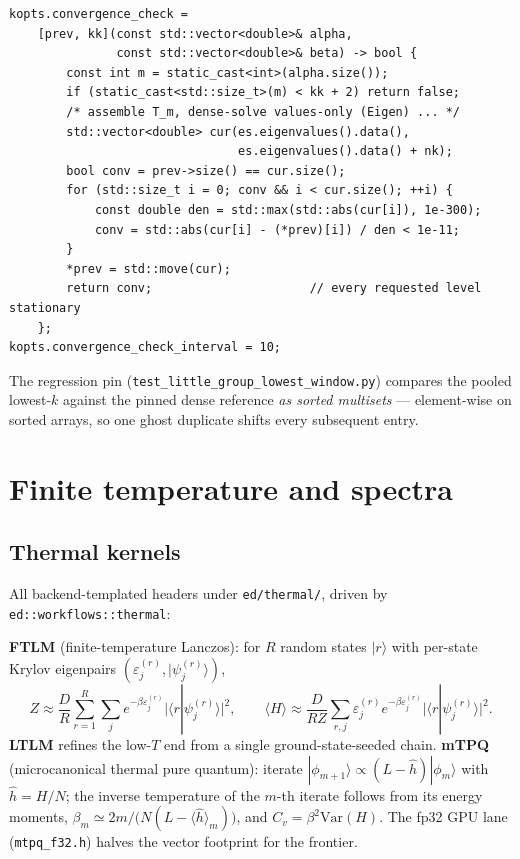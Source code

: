 \documentclass[11pt]{article}
\newcommand{\ket}[1]{|#1\rangle}
\newcommand{\braket}[2]{\langle#1|#2\rangle}
\newcommand{\file}[1]{\texttt{\small #1}}
\begin{document}
\begin{lstlisting}
kopts.convergence_check =
    [prev, kk](const std::vector<double>& alpha,
               const std::vector<double>& beta) -> bool {
        const int m = static_cast<int>(alpha.size());
        if (static_cast<std::size_t>(m) < kk + 2) return false;
        /* assemble T_m, dense-solve values-only (Eigen) ... */
        std::vector<double> cur(es.eigenvalues().data(),
                                es.eigenvalues().data() + nk);
        bool conv = prev->size() == cur.size();
        for (std::size_t i = 0; conv && i < cur.size(); ++i) {
            const double den = std::max(std::abs(cur[i]), 1e-300);
            conv = std::abs(cur[i] - (*prev)[i]) / den < 1e-11;
        }
        *prev = std::move(cur);
        return conv;                      // every requested level stationary
    };
kopts.convergence_check_interval = 10;
\end{lstlisting}

The regression pin (\file{test\_little\_group\_lowest\_window.py}) compares
the pooled lowest-$k$ against the pinned dense reference \emph{as sorted
multisets} --- element-wise on sorted arrays, so one ghost duplicate shifts
every subsequent entry.

\section{Finite temperature and spectra}

\subsection{Thermal kernels}

All backend-templated headers under \file{ed/thermal/}, driven by
\texttt{ed::workflows::thermal}:

\textbf{FTLM} (finite-temperature Lanczos): for $R$ random states $\ket{r}$
with per-state Krylov eigenpairs $(\varepsilon_j^{(r)}, \ket{\psi_j^{(r)}})$,
\begin{equation}
  Z \approx \frac{D}{R} \sum_{r=1}^{R} \sum_j
    e^{-\beta \varepsilon_j^{(r)}} \bigl|\braket{r}{\psi_j^{(r)}}\bigr|^2,
  \qquad
  \langle H \rangle \approx \frac{D}{RZ} \sum_{r,j}
    \varepsilon_j^{(r)} e^{-\beta \varepsilon_j^{(r)}}
    \bigl|\braket{r}{\psi_j^{(r)}}\bigr|^2 .
\end{equation}
\textbf{LTLM} refines the low-$T$ end from a single ground-state-seeded
chain. \textbf{mTPQ} (microcanonical thermal pure quantum): iterate
$\ket{\phi_{m+1}} \propto (L - \hat h)\ket{\phi_m}$ with
$\hat h = H/N$; the inverse temperature of the $m$-th iterate follows from
its energy moments,
$\beta_m \simeq 2m / \bigl(N (L - \langle \hat h \rangle_m)\bigr)$, and
$C_v = \beta^2 \mathrm{Var}(H)$. The fp32 GPU lane
(\file{mtpq\_f32.h}) halves the vector footprint for the frontier.
\end{document}
